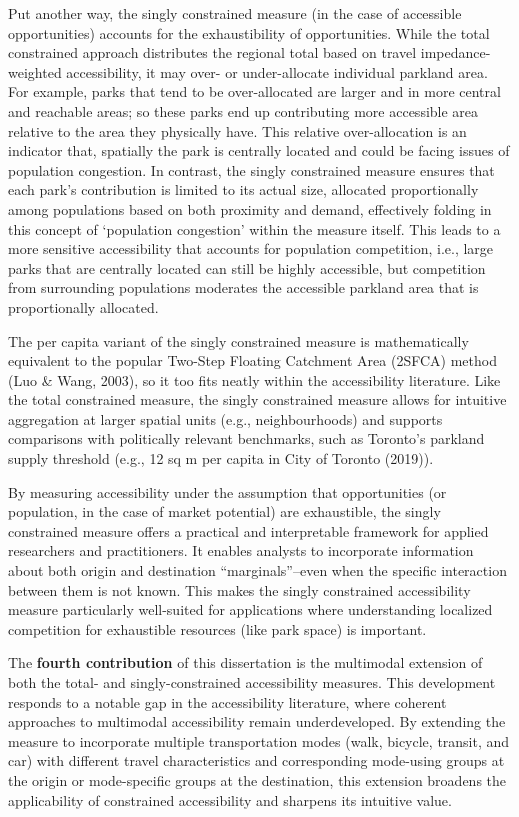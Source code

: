 \documentclass[
11pt, %
oneside, %
english, %
singlespacing, %
]{macthesis} %
\begin{document}
Put another way, the singly constrained measure (in the case of accessible opportunities) accounts for the exhaustibility of opportunities. While the total constrained approach distributes the regional total based on travel impedance-weighted accessibility, it may over- or under-allocate individual parkland area. For example, parks that tend to be over-allocated are larger and in more central and reachable areas; so these parks end up contributing more accessible area relative to the area they physically have. This relative over-allocation is an indicator that, spatially the park is centrally located and could be facing issues of population congestion. In contrast, the singly constrained measure ensures that each park's contribution is limited to its actual size, allocated proportionally among populations based on both proximity and demand, effectively folding in this concept of `population congestion' within the measure itself. This leads to a more sensitive accessibility that accounts for population competition, i.e., large parks that are centrally located can still be highly accessible, but competition from surrounding populations moderates the accessible parkland area that is proportionally allocated.

The per capita variant of the singly constrained measure is mathematically equivalent to the popular Two-Step Floating Catchment Area (2SFCA) method (Luo \& Wang, 2003), so it too fits neatly within the accessibility literature. Like the total constrained measure, the singly constrained measure allows for intuitive aggregation at larger spatial units (e.g., neighbourhoods) and supports comparisons with politically relevant benchmarks, such as Toronto's parkland supply threshold (e.g., 12 sq m per capita in City of Toronto (2019)).

By measuring accessibility under the assumption that opportunities (or population, in the case of market potential) are exhaustible, the singly constrained measure offers a practical and interpretable framework for applied researchers and practitioners. It enables analysts to incorporate information about both origin and destination ``marginals''--even when the specific interaction between them is not known. This makes the singly constrained accessibility measure particularly well-suited for applications where understanding localized competition for exhaustible resources (like park space) is important.

The \textbf{fourth contribution} of this dissertation is the multimodal extension of both the total- and singly-constrained accessibility measures. This development responds to a notable gap in the accessibility literature, where coherent approaches to multimodal accessibility remain underdeveloped. By extending the measure to incorporate multiple transportation modes (walk, bicycle, transit, and car) with different travel characteristics and corresponding mode-using groups at the origin or mode-specific groups at the destination, this extension broadens the applicability of constrained accessibility and sharpens its intuitive value.
\end{document}
